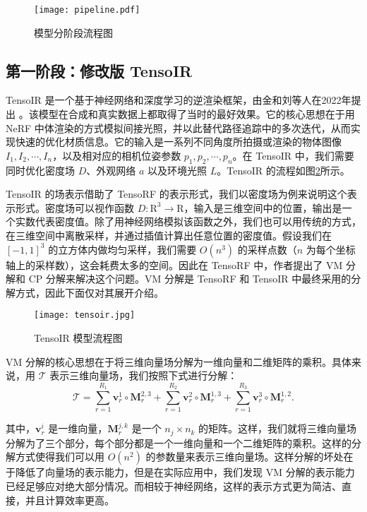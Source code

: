 \begin{figure}
  \centering
  \texttt{[image: pipeline.pdf]}
  \caption{模型分阶段流程图}
  \label{fig:pipeline}
\end{figure}

\subsection{第一阶段：修改版 TensoIR}

TensoIR 是一个基于神经网络和深度学习的逆渲染框架，由金和刘等人在2022年提出 \cite{tensoir}。该模型在合成和真实数据上都取得了当时的最好效果。它的核心思想在于用 NeRF 中体渲染的方式模拟间接光照，并以此替代路径追踪中的多次迭代，从而实现快速的优化材质信息。它的输入是一系列不同角度所拍摄或渲染的物体图像 $I_1, I_2, \cdots, I_n$，以及相对应的相机位姿参数 $p_1, p_2, \cdots, p_n$。在 TensoIR 中，我们需要同时优化密度场 $D$、外观网络 $a$ 以及环境光照 $L$。TensoIR 的流程如图\ref{fig:tensoir}所示。

TensoIR 的场表示借助了 TensoRF \cite{tensorf} 的表示形式，我们以密度场为例来说明这个表示形式。密度场可以视作函数 $D: \mathrm{R} ^3 \to \mathrm{R}$，输入是三维空间中的位置，输出是一个实数代表密度值。除了用神经网络模拟该函数之外，我们也可以用传统的方式，在三维空间中离散采样，并通过插值计算出任意位置的密度值。假设我们在 $[-1,1]^3$ 的立方体内做均匀采样，我们需要 $O(n^3)$ 的采样点数（$n$ 为每个坐标轴上的采样数），这会耗费太多的空间。因此在 TensoRF 中，作者提出了 VM 分解和 CP 分解来解决这个问题。VM 分解是 TensoRF 和 TensoIR 中最终采用的分解方式，因此下面仅对其展开介绍。

\begin{figure}[h]
  \centering
  \texttt{[image: tensoir.jpg]}
  \caption{TensoIR 模型流程图}
  \label{fig:tensoir}
\end{figure}

VM 分解的核心思想在于将三维向量场分解为一维向量和二维矩阵的乘积。具体来说，用 $\mathcal{T}$ 表示三维向量场，我们按照下式进行分解：
\begin{equation}
  \mathcal{T}=\sum_{r=1}^{R_1}\mathbf{v}_r^1\circ\mathbf{M}_r^{2,3}+\sum_{r=1}^{R_2}\mathbf{v}_r^2\circ\mathbf{M}_r^{1,3}+\sum_{r=1}^{R_3}\mathbf{v}_r^3\circ\mathbf{M}_r^{1,2}.
\end{equation}

其中，$\mathbf{v}_r^i$ 是一维向量，$\mathbf{M}_r^{j,k}$ 是一个 $n_j \times n_k$ 的矩阵。这样，我们就将三维向量场分解为了三个部分，每个部分都是一个一维向量和一个二维矩阵的乘积。这样的分解方式使得我们可以用 $O(n^2)$ 的参数量来表示三维向量场。这样分解的坏处在于降低了向量场的表示能力，但是在实际应用中，我们发现 VM 分解的表示能力已经足够应对绝大部分情况。而相较于神经网络，这样的表示方式更为简洁、直接，并且计算效率更高。

